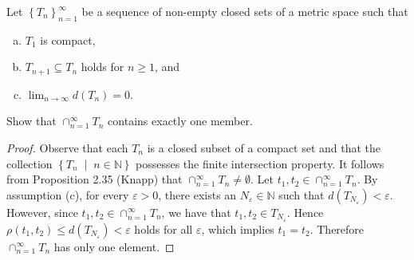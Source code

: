 \documentclass[12pt]{amsart}
\begin{document}
\begin{ex12}
  Let $\left\{T_n\right\}_{n=1}^{\infty}$ be a sequence of non-empty closed sets of a metric space such that 
  \begin{enumerate}[(a)]
    \item
      $T_1$ is compact,
    \item
      $T_{n+1} \subseteq T_n$ holds for $n \geq 1$, and
    \item
      $\lim_{n \rightarrow \infty} d(T_n) = 0$.
  \end{enumerate}
  Show that $\cap_{n=1}^{\infty} T_n$ contains exactly one member.
  \begin{proof}
    Observe that each $T_n$ is a closed subset of a compact set and that the collection $\left\{T_n \;\middle\vert\; n \in \mathbb{N}\right\}$ possesses the finite intersection property.
    It follows from Proposition 2.35 (Knapp) that $\cap_{n=1}^{\infty} T_n \not = \emptyset$.
    Let $t_1, t_2 \in \cap_{n=1}^{\infty} T_n$.
    By assumption (c), for every $\varepsilon > 0$, there exists an $N_\varepsilon \in \mathbb{N}$ such that $d(T_{N_\varepsilon}) < \varepsilon$.
    However, since $t_1, t_2 \in \cap_{n=1}^{\infty} T_n$, we have that $t_1, t_2 \in T_{N_\varepsilon}$. 
    Hence $\rho(t_1, t_2) \leq d(T_{N_\varepsilon}) < \varepsilon$ holds for all $\varepsilon$, which implies $t_1 = t_2$.
    Therefore $\cap_{n=1}^{\infty} T_n$ has only one element.
  \end{proof}
\end{ex12}
\end{document}
